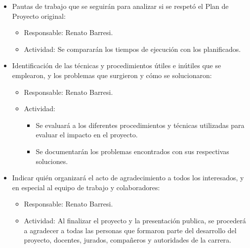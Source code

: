 \documentclass[
11pt, %
]{charter}
\begin{document}
\begin{itemize}
	\item Pautas de trabajo que se seguirán para analizar si se respetó el Plan de Proyecto original:
		\begin{itemize}
	 		\item Responsable: Renato Barresi.
	 		\item Actividad: Se compararán los tiempos de ejecución con los planificados.\\
		\end{itemize}	  
	\item Identificación de las técnicas y procedimientos útiles e inútiles que se emplearon, y los problemas que surgieron y cómo se solucionaron:
		\begin{itemize}
	 		\item Responsable: Renato Barresi.
	 		\item Actividad:
	 			\begin{itemize}
	 				\item Se evaluará a los diferentes procedimientos y técnicas utilizadas para evaluar el impacto en el proyecto.
	 				\item Se documentarán los problemas encontrados con sus respectivas soluciones.
	 			\end{itemize}
		\end{itemize}	  
	\item Indicar quién organizará el acto de agradecimiento a todos los interesados, y en especial al equipo de trabajo y colaboradores:
		\begin{itemize}
	 		\item Responsable: Renato Barresi.
	 		\item Actividad: Al finalizar el proyecto y la presentación publica, se procederá a agradecer a todas las personas que formaron parte del desarrollo del proyecto, docentes, jurados, compañeros y autoridades de la carrera.\\
		\end{itemize}	  
\end{itemize}
\end{document}
